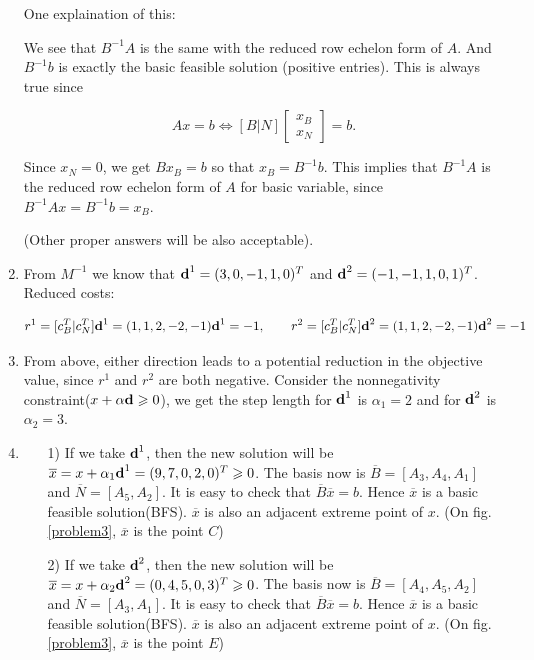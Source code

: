 \documentclass[12pt]{article}
\begin{document}
\begin{enumerate}[label = (\alph*)]
One explaination of this:

We see that $B^{-1}A$ is the same with the reduced row echelon form of $A$. And $B^{-1}b$ is exactly the basic feasible solution (positive entries). This is always true since

$$
Ax = b \Leftrightarrow [B | N]\begin{bmatrix}
x_B \\ x_N
\end{bmatrix} = b.
$$

Since $x_N = 0$, we get $Bx_B = b$ so that $x_B = B^{-1}b$. This implies that $B^{-1}A$ is the reduced row echelon form of $A$ for basic variable, since $B^{-1}Ax = B^{-1}b = x_B$.

(Other proper answers will be also acceptable).

\item

From $M^{-1}$ we know that $\textbf d^1 = (3,0,-1,1,0)^T$ and $\textbf d^2 = (-1,-1,1,0,1)^T$. Reduced costs:

$$
r^1 = [c_B^T|c_N^T]\textbf d^1 = (1,1,2,-2,-1)\textbf d^1 = -1, \qquad r^2 = [c_B^T|c_N^T]\textbf d^2 = (1,1,2,-2,-1)\textbf d^2 = -1
$$

\item

From above, either direction leads to a potential reduction in the objective value, since $r^1$ and $r^2$ are both negative. Consider the nonnegativity constraint($x + \alpha \textbf d \geqslant 0$), we get the step length for $\textbf d^1$ is $\alpha_1 = 2$ and for $\textbf d^2$ is $\alpha_2 = 3$.

\item
\begin{enumerate}
\item[1)] If we take $\textbf d^1$, then the new solution will be $\overline{x} = x + \alpha_1 \textbf d^1 = (9,7,0,2,0)^T \geqslant 0$. The basis now is $\overline{B} = [A_3, A_4, A_1]$ and $\overline{N} = [A_5, A_2]$. It is easy to check that $\overline{B}\overline x = b$. Hence $\overline{x}$ is a basic feasible solution(BFS). $\overline{x}$ is also an adjacent extreme point of $x$. (On fig.\ref{problem3}, $\overline{x}$ is the point $C$)

\item[2)] If we take $\textbf d^2$, then the new solution will be $\overline{x} = x + \alpha_2 \textbf d^2 = (0,4,5,0,3)^T \geqslant 0$. The basis now is $\overline{B} = [A_4, A_5, A_2]$ and $\overline{N} = [A_3, A_1]$. It is easy to check that $\overline{B}\overline x = b$. Hence $\overline{x}$ is a basic feasible solution(BFS). $\overline{x}$ is also an adjacent extreme point of $x$. (On fig.\ref{problem3}, $\overline{x}$ is the point $E$)


\end{enumerate}
\end{enumerate}
\end{document}
